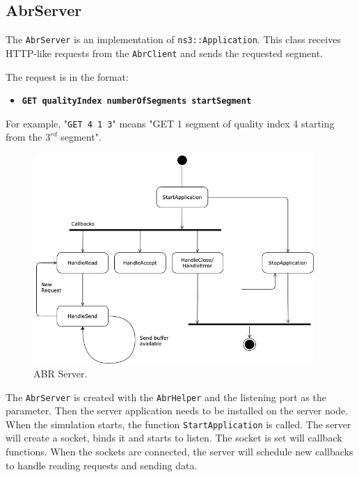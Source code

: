 \subsection{AbrServer}

The \texttt{AbrServer} is an implementation of \texttt{ns3::Application}. This class 
receives HTTP-like requests from the \texttt{AbrClient} and sends the requested segment.

The request is in the format:

\begin{itemize}[noitemsep, topsep=0pt]
  \centering
  \item[] \texttt{\textbf{GET qualityIndex numberOfSegments startSegment}}
\end{itemize}

For example, "\texttt{GET 4 1 3}" means "GET 1 segment of quality index 4 starting from the 
${3^{rd}}$ segment".


\begin{figure}[h]
  \centering
  \includegraphics[width=0.95\textwidth]{img/abrserver.png}
  \caption{ABR Server.}
  \label{fig:abrserver}
\end{figure}


The \texttt{AbrServer} is created with the \texttt{AbrHelper} and the listening port as the 
parameter. Then the
server application needs to be installed on the server node. When the simulation starts, the 
function \texttt{StartApplication} is called. The server will create a socket, binds it and starts
to listen.
The socket is set will callback functions. When the sockets are connected, the server 
will schedule new callbacks to handle reading requests and sending data.


